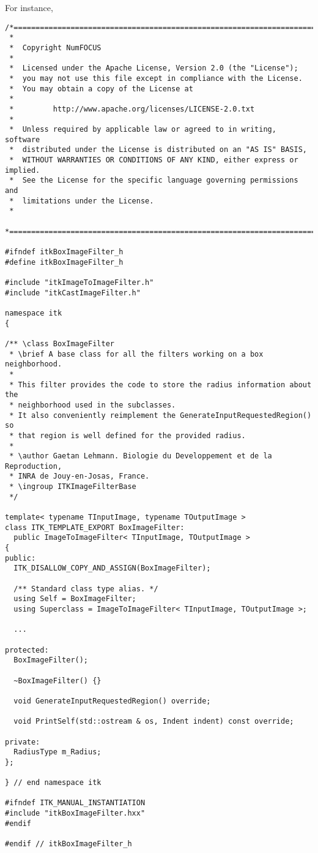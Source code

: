 For instance,

\small
\begin{verbatim}
/*=========================================================================
 *
 *  Copyright NumFOCUS
 *
 *  Licensed under the Apache License, Version 2.0 (the "License");
 *  you may not use this file except in compliance with the License.
 *  You may obtain a copy of the License at
 *
 *         http://www.apache.org/licenses/LICENSE-2.0.txt
 *
 *  Unless required by applicable law or agreed to in writing, software
 *  distributed under the License is distributed on an "AS IS" BASIS,
 *  WITHOUT WARRANTIES OR CONDITIONS OF ANY KIND, either express or implied.
 *  See the License for the specific language governing permissions and
 *  limitations under the License.
 *
 *=========================================================================*/

#ifndef itkBoxImageFilter_h
#define itkBoxImageFilter_h

#include "itkImageToImageFilter.h"
#include "itkCastImageFilter.h"

namespace itk
{

/** \class BoxImageFilter
 * \brief A base class for all the filters working on a box neighborhood.
 *
 * This filter provides the code to store the radius information about the
 * neighborhood used in the subclasses.
 * It also conveniently reimplement the GenerateInputRequestedRegion() so
 * that region is well defined for the provided radius.
 *
 * \author Gaetan Lehmann. Biologie du Developpement et de la Reproduction,
 * INRA de Jouy-en-Josas, France.
 * \ingroup ITKImageFilterBase
 */

template< typename TInputImage, typename TOutputImage >
class ITK_TEMPLATE_EXPORT BoxImageFilter:
  public ImageToImageFilter< TInputImage, TOutputImage >
{
public:
  ITK_DISALLOW_COPY_AND_ASSIGN(BoxImageFilter);

  /** Standard class type alias. */
  using Self = BoxImageFilter;
  using Superclass = ImageToImageFilter< TInputImage, TOutputImage >;

  ...

protected:
  BoxImageFilter();

  ~BoxImageFilter() {}

  void GenerateInputRequestedRegion() override;

  void PrintSelf(std::ostream & os, Indent indent) const override;

private:
  RadiusType m_Radius;
};

} // end namespace itk

#ifndef ITK_MANUAL_INSTANTIATION
#include "itkBoxImageFilter.hxx"
#endif

#endif // itkBoxImageFilter_h
\end{verbatim}
\normalsize

